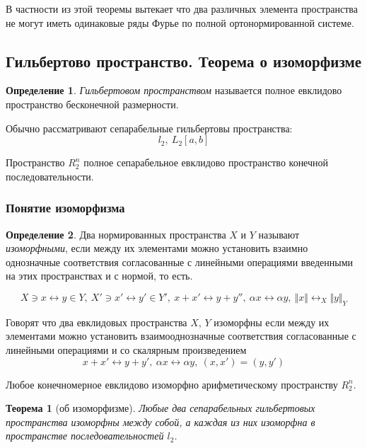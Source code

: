 \documentclass[14pt,a4paper]{extarticle}
\newtheorem{theorem}{Теорема}[section]
\theoremstyle{definition}
\newtheorem{definition}{Определение}[section]
\theoremstyle{remark}
\renewcommand{\[}{\begin{dmath*}[compact]}
\renewcommand{\]}{\end{dmath*}}
\newcommand{\sep}{ , \ \allowbreak }
\begin{document}
В частности из этой теоремы вытекает что два различных элемента пространства
не могут иметь одинаковые ряды Фурье по полной ортонормированной системе.

\subsection{Гильбертово пространство. Теорема о изоморфизме}
\label{subsec:gp_toi}

\begin{definition}
  \textit{Гильбертовом пространством} называется полное евклидово пространство
  бесконечной размерности.
\end{definition}

Обычно рассматривают сепарабельные гильбертовы пространства:
\[l_2 \sep L_2[a,b]\]

Пространство $R_2^n$ полное сепарабельное евклидово пространство конечной
последовательности.

\subsubsection{Понятие изоморфизма}

\begin{definition}
  Два нормированных пространства $X$ и $Y$ называют \textit{изоморфными},
  если между их элементами можно установить взаимно однозначные соответствия
  согласованные с линейными операциями введенными на этих пространствах
  и с нормой, то есть.

  \[X\ni x \leftrightarrow y \in Y \sep
  {X'\ni x' \leftrightarrow y' \in Y'} \sep
  {x + x' \leftrightarrow y + y''} \sep
  {\alpha x \leftrightarrow \alpha y} \sep
  {\Vert x \Vert \leftrightarrow_X \Vert y \Vert_Y}\]
\end{definition}

Говорят что два евклидовых пространства $X$, $Y$ изоморфны если между их
элементами можно установить взаимооднозначные соответствия согласованные
с линейными операциями и со скалярным произведением
\[{x+x' \leftrightarrow y + y'} \sep {\alpha x \leftrightarrow \alpha y}
\sep {(x,x')=(y,y')}\]

Любое конечномерное евклидово изоморфно арифметическому пространству $R_2^n$.

\begin{theorem}[об изоморфизме]
\label{th:об изоморфизме}
  Любые два сепарабельных гильбертовых пространства изоморфны между собой,
  а каждая из них изоморфна в пространстве последовательностей $l_2$.
\end{theorem}
\end{document}
